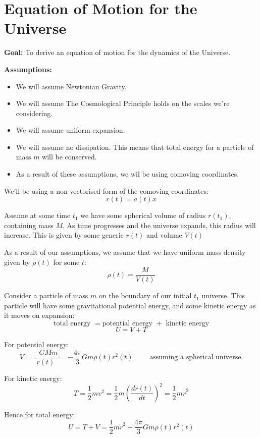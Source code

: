 
\section{Equation of Motion for the Universe}

\textbf{Goal: } To derive an equation of motion for the dynamics of the Universe.

\textbf{Assumptions: }

\begin{itemize}
    \item We will assume Newtonian Gravity.
    \item We will assume The Cosmological Principle holds on the scales we're considering.
    \item We will assume uniform expansion.
    \item We will assume no dissipation. This means that total energy for a particle of mass $m$ will be conserved.
    \item As a result of these assumptions, we wil be using comoving coordinates.
\end{itemize}

We'll be using a non-vectorised form of the comoving coordinates:
\[
    \boxed{r(t) = a(t) x}
\]

Assume at some time $t_1$ we have some spherical volume of radius $r(t_1)$, containing mass $M$. As time progresses and the universe expands, this radius will increase. This is given by some generic $r(t)$ and volume $V(t)$

As a result of our assumptions, we assume that we have uniform mass density given by $\rho(t)$ for some $t$:
\[
    \rho(t) = \frac{M}{V(t)}
\]

Consider a particle of mass $m$ on the boundary of our initial $t_1$ universe. This particle will have some gravitational potential energy, and some kinetic energy as it moves on expansion:
\[
    \text{total energy } = \text{potential energy } + \text{ kinetic energy}
\]
\[
    U = V + T
\]

For potential energy:
\[
    V = \frac{-G Mm}{r(t)} = - \frac{4 \pi}{3} Gm \rho (t) r^2(t) \qquad \text{ assuming a spherical universe.}
\]

For kinetic energy:
\[
    T = \frac{1}{2} m v^2 = \frac{1}{2}m \left(\frac{dr(t)}{dt}\right)^2 = \frac{1}{2} m \dot{r}^2
\]

Hence for total energy:
\[
    U = T+V =\frac{1}{2} m \dot{r}^2 - \frac{4 \pi}{3} Gm \rho (t) r^2(t)
\]

